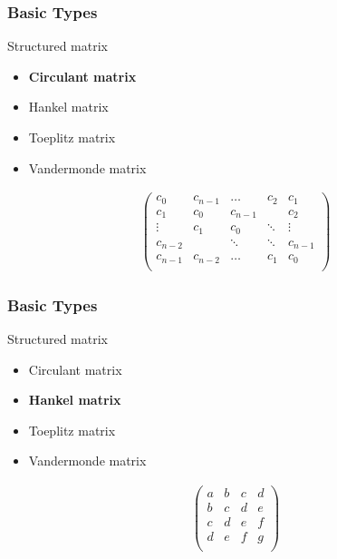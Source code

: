 \begin{frame}
\frametitle{Basic Types}

\begin{block}{Structured matrix}
  \begin{itemize}
   \item \textbf{Circulant matrix}
   \item Hankel matrix
   \item Toeplitz matrix
   \item Vandermonde matrix
  \end{itemize}
\end{block}

\begin{align*}
 \left( \begin{array}{ccccc}
         c_0 & c_{n-1} & \ldots & c_2 & c_1 \\
         c_1 & c_0 & c_{n-1} & & c_2 \\
         \vdots & c_1 & c_0 & \ddots & \vdots \\
         c_{n-2} & & \ddots & \ddots & c_{n-1} \\
         c_{n-1} & c_{n-2} & \hdots & c_1 & c_0 \\
        \end{array} \right)
\end{align*}

\end{frame}



\begin{frame}
\frametitle{Basic Types}

\begin{block}{Structured matrix}
  \begin{itemize}
   \item Circulant matrix
   \item \textbf{Hankel matrix}
   \item Toeplitz matrix
   \item Vandermonde matrix
  \end{itemize}
\end{block}

\begin{align*}
 \left( \begin{array}{cccc}
         a & b & c & d \\
         b & c & d & e \\
         c & d & e & f \\
         d & e & f & g \\
        \end{array} \right)
\end{align*}

\vspace{0.9cm}

\end{frame}


